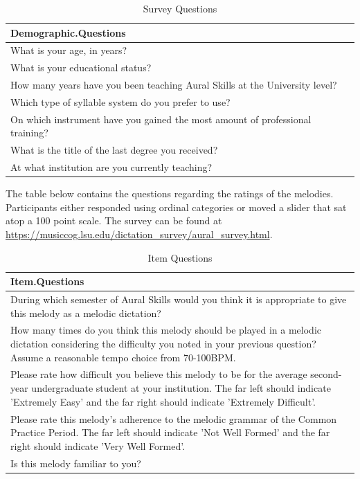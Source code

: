 \documentclass[12pt,]{book}
\begin{document}
\begin{table}[t]

\caption{\label{tab:surveyQuestions1}Survey Questions}
\centering
\begin{tabular}{l}
\toprule
Demographic.Questions\\
\midrule
What is your age, in years?\\
What is your educational status?\\
How many years have you been teaching Aural Skills at the University level?\\
Which type of syllable system do you prefer to use?\\
On which instrument have you gained the most amount of professional training?\\
\addlinespace
What is the title of the last degree you received?\\
At what institution are you currently teaching?\\
\bottomrule
\end{tabular}
\end{table}

The table below contains the questions regarding the ratings of the melodies.
Participants either responded using ordinal categories or moved a slider that sat atop a 100 point scale.
The survey can be found at \url{https://musiccog.lsu.edu/dictation_survey/aural_survey.html}.

\begin{table}[t]

\caption{\label{tab:surveyQuestions2}Item Questions}
\centering
\begin{tabular}{l}
\toprule
Item.Questions\\
\midrule
During which semester of Aural Skills would you think it is appropriate to give this melody as a melodic dictation?\\
How many times do you think this melody should be played in a melodic dictation considering the difficulty you noted in your previous question? Assume a reasonable tempo choice from 70-100BPM.\\
Please rate how difficult you believe this melody to be for the average second-year undergraduate student at your institution. The far left should indicate 'Extremely Easy' and the far right should indicate 'Extremely Difficult'.\\
Please rate this melody's adherence to the melodic grammar of the Common Practice Period. The far left should indicate 'Not Well Formed' and the far right should indicate 'Very Well Formed'.\\
Is this melody familiar to you?\\
\bottomrule
\end{tabular}
\end{table}
\end{document}
